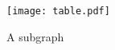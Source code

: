 \begin{figure}[h]
  \centering
  \texttt{[image: table.pdf]}
  \caption{A subgraph}
  \label{fig:result}
\end{figure}
